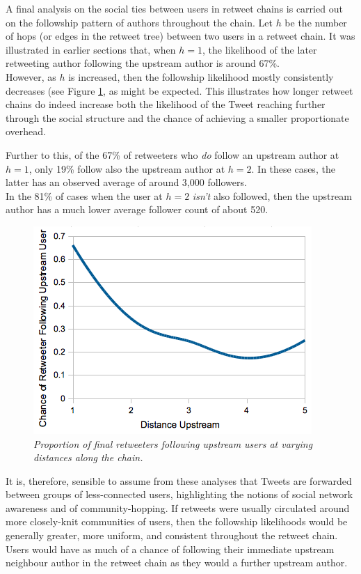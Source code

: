 A final analysis on the social ties between users in retweet chains is carried out on the followship pattern of authors throughout the chain. Let $h$ be the number of hops (or edges in the retweet tree) between two users in a retweet chain. It was illustrated in earlier sections that, when $h = 1$, the likelihood of the later retweeting author following the upstream author is around 67\%.\\
However, as $h$ is increased, then the followship likelihood mostly consistently decreases (see Figure \ref{fig:following-possibility}, as might be expected. This illustrates how longer retweet chains do indeed increase both the likelihood of the Tweet reaching further through the social structure and the chance of achieving a smaller proportionate overhead.

Further to this, of the 67\% of retweeters who \textit{do} follow an upstream author at $h = 1$, only 19\% follow also the upstream author at $h = 2$. In these cases, the latter has an observed average of around 3,000 followers.\\
In the 81\% of cases when the user at $h = 2$ \textit{isn't} also followed, then the upstream author has a much lower average follower count of about 520.

\begin{figure}[h]
\centering
\includegraphics[scale=0.55]{3.Chapter1/Media/following-possibility.png} 
\caption{\textit{Proportion of final retweeters following upstream users at varying distances along the chain.}}
\label{fig:following-possibility}
\end{figure}

It is, therefore, sensible to assume from these analyses that Tweets are forwarded between groups of less-connected users, highlighting the notions of social network awareness and of community-hopping. If retweets were usually circulated around more closely-knit communities of users, then the followship likelihoods would be generally greater, more uniform, and consistent throughout the retweet chain. Users would have as much of a chance of following their immediate upstream neighbour author in the retweet chain as they would a further upstream author.

